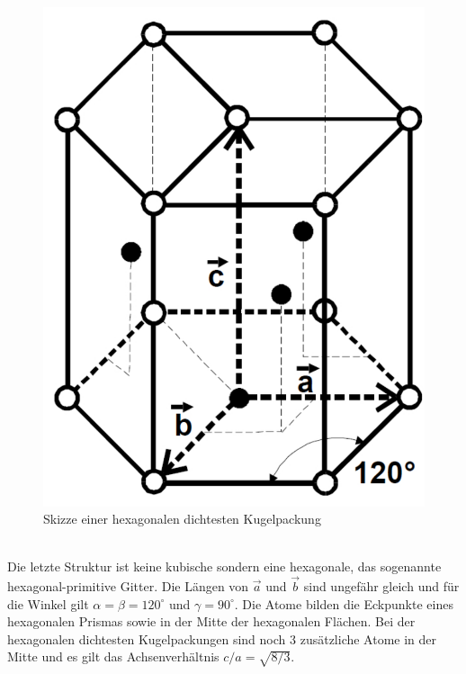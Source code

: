 \begin{figure}[h!]
	\centering
	\includegraphics[scale=0.2]{../Grafiken/HexagonalesGitter.pdf}
	\caption{Skizze einer hexagonalen dichtesten Kugelpackung}
\end{figure}\\
Die letzte Struktur ist keine kubische sondern eine hexagonale, das sogenannte hexagonal-primitive Gitter. Die Längen von $\vec{a}$ und $\vec{b}$ sind ungefähr gleich und für die Winkel gilt $\alpha=\beta=120^\circ$ und $\gamma=90^\circ$. Die Atome bilden die Eckpunkte eines hexagonalen Prismas sowie in der Mitte der hexagonalen Flächen. Bei der hexagonalen dichtesten Kugelpackungen sind noch 3 zusätzliche Atome in der Mitte und es gilt das Achsenverhältnis $c/a=\sqrt{8/3}$. 

